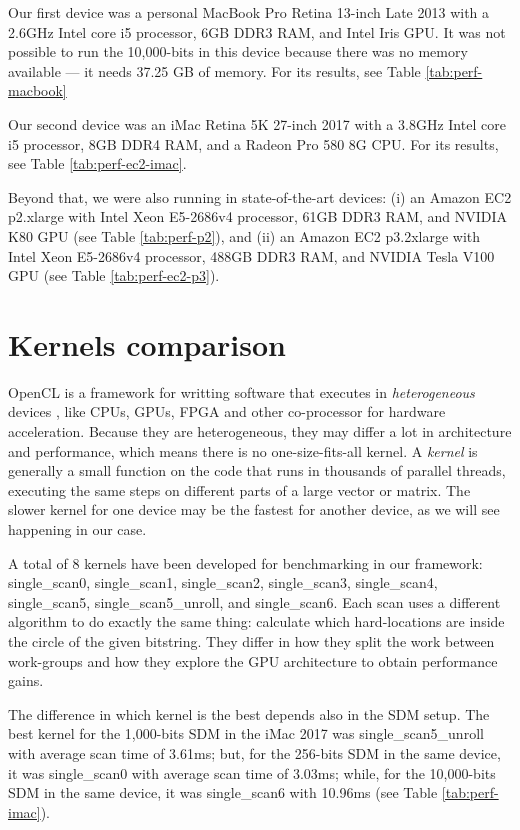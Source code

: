 Our first device was a personal MacBook Pro Retina 13-inch Late 2013 with a 2.6GHz Intel core i5 processor, 6GB DDR3 RAM, and Intel Iris GPU. It was not possible to run the 10,000-bits in this device because there was no memory available --- it needs 37.25 GB of memory. For its results, see Table \ref{tab:perf-macbook}

Our second device was an iMac Retina 5K 27-inch 2017 with a 3.8GHz Intel core i5 processor, 8GB DDR4 RAM, and a Radeon Pro 580 8G CPU. For its results, see Table \ref{tab:perf-ec2-imac}.

Beyond that, we were also running in state-of-the-art devices: (i) an Amazon EC2 p2.xlarge with Intel Xeon E5-2686v4 processor, 61GB DDR3 RAM, and NVIDIA K80 GPU (see Table \ref{tab:perf-p2}), and (ii) an Amazon EC2 p3.2xlarge with Intel Xeon E5-2686v4 processor, 488GB DDR3 RAM, and NVIDIA Tesla V100 GPU (see Table \ref{tab:perf-ec2-p3}).


\section{Kernels comparison}

OpenCL is a framework for writting software that executes in \emph{heterogeneous} devices \citep{munshi2009opencl}, like CPUs, GPUs, FPGA and other co-processor for hardware acceleration. Because they are heterogeneous, they may differ a lot in architecture and performance, which means there is no one-size-fits-all kernel. A \emph{kernel} is generally a small function on the code that runs in thousands of parallel threads, executing the same steps on different parts of a large vector or matrix. The slower kernel for one device may be the fastest for another device, as we will see happening in our case.

A total of 8 kernels have been developed for benchmarking in our framework: single\_scan0, single\_scan1, single\_scan2, single\_scan3, single\_scan4, single\_scan5, single\_scan5\_unroll, and single\_scan6. Each scan uses a different algorithm to do exactly the same thing: calculate which hard-locations are inside the circle of the given bitstring. They differ in how they split the work between work-groups and how they explore the GPU architecture to obtain performance gains.

The difference in which kernel is the best depends also in the SDM setup. The best kernel for the 1,000-bits SDM in the iMac 2017 was single\_scan5\_unroll with average scan time of 3.61ms; but, for the 256-bits SDM in the same device, it was single\_scan0 with average scan time of 3.03ms; while, for the 10,000-bits SDM in the same device, it was single\_scan6 with 10.96ms (see Table \ref{tab:perf-imac}).

